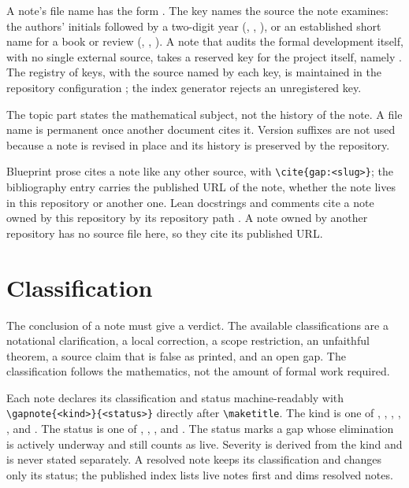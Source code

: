 \documentclass{article}
\providecommand{\gapnote}[2]{%
    \par\noindent\textbf{Verdict:} #1 (#2).\par}
\begin{document}
A note's file name has the form . The key names the
source the note examines: the authors' initials followed by a two-digit year
(, , ), or an established short name
for a book or review (, , ). A note that audits
the formal development itself, with no single external source, takes a reserved
key for the project itself, namely . The registry of keys, with
the source named by each key, is maintained in the repository configuration
; the index generator rejects an unregistered key.

The topic part states the mathematical subject, not the history of the note. A
file name is permanent once another document cites it. Version suffixes are not
used because a note is revised in place and its history is preserved by the
repository.

Blueprint prose cites a note like any other source, with
\verb|\cite{gap:<slug>}|; the bibliography entry carries the published URL of
the note, whether the note lives in this repository or another one. Lean
docstrings and comments cite a note owned by this repository by its repository
path . A note owned by another repository has
no source file here, so they cite its published URL.

\section{Classification}

The conclusion of a note must give a verdict. The available classifications
are a notational clarification, a local correction, a scope restriction, an
unfaithful theorem, a source claim that is false as printed, and an open gap.
The classification follows the mathematics, not the amount of formal work
required.

Each note declares its classification and status machine-readably with
\verb|\gapnote{<kind>}{<status>}| directly after \verb|\maketitle|. The kind
is one of , ,
, , , and
. The status is one of , ,
, and . The status  marks a gap whose
elimination is actively underway and still counts as live. Severity is derived
from the kind and is never stated separately. A resolved note keeps its
classification and changes only its status; the published index lists live
notes first and dims resolved notes.
\end{document}
